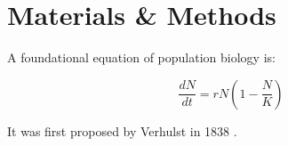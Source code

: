 \documentclass[11pt]{article}
\begin{document}
  \section{Materials \& Methods}
  
  A foundational equation of population biology is:
  
  \begin{equation}
    \frac{dN}{dt} = r N (1 - \frac{N}{K})
  \end{equation}
  
  It was first proposed by Verhulst in 1838 \cite{verhulst1838notice}.
  
  
  
  
\end{document}
